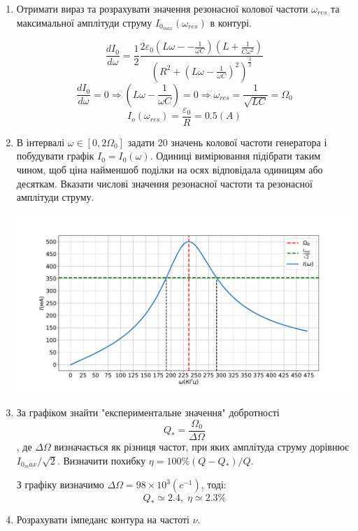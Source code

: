 \documentclass[a4paper, 12pt]{article}
\begin{document}
\begin{enumerate}
    \item Отримати вираз та розрахувати значення резонасної колової частоти 
    $\omega_{res}$ та максимальної амплітуди струму $I_{0_{max}}(\omega_{res})$ в контурі.

    $$ \frac{dI_0}{d\omega} = 
    \frac{1}{2} \frac{2 \varepsilon_0 \left( L \omega- - \frac{1}{\omega C} \right) \left( L + \frac{1}{C \omega^2} \right)}
    { \left(R^2 + \left( L \omega - \frac{1}{\omega C} \right)^2 \right)^{\frac{3}{2}} }$$
    $$ \frac{dI_0}{d\omega} = 0 \Rightarrow \left( L \omega - \frac{1}{\omega C} \right) = 0 \Rightarrow 
    \omega_{res} = \frac{1}{\sqrt{LC}} = \Omega_0 $$
    $$ I_o(\omega_{res}) = \frac{\varepsilon_0}{R} = 0.5 (A)$$

    \item В інтервалі $\omega \in \left[ 0,2\Omega_0 \right]$ задати 20
    значень колової частоти генератора і побудувати графік $I_0=I_0(\omega)$.
    Одиниці вимірювання підібрати таким чином, щоб ціна найменшоб поділки на осях
    відповідала одиницям або десяткам. Вказати числові значення резонасної частоти
    та резонасної амплітуди струму.
    
    \includegraphics[width=1.0\textwidth]{graphics/I(w).pdf}

    \item За графіком знайти "експериментальне значення" добротності
    $$Q_* = \frac{\Omega_0}{\Delta \Omega}$$,
    де $\Delta \Omega$ визначається як різниця частот, при яких амплітуда
    струму дорівнює $I_{0_max}/\sqrt{2}$. 
    Визначити похибку $\eta = 100\% \left( Q-Q_* \right) / Q$.
 
    З графіку визначимо $\Delta \Omega = 98 \times 10^3(c^{-1})$, тоді:
    $$ Q_* \simeq 2.4, \; \eta \simeq 2.3 \%$$

    \item Розрахувати імпеданс контура на частоті $\nu$.


\end{enumerate}
\end{document}
